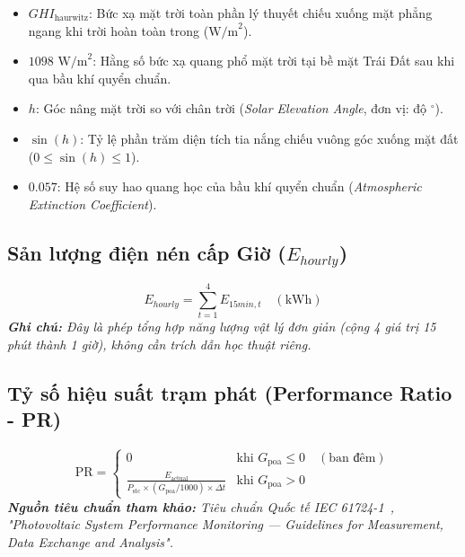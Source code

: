 \documentclass[12pt,a4paper]{article}
\begin{document}
\begin{itemize}
    \item $GHI_{\text{haurwitz}}$: Bức xạ mặt trời toàn phần lý thuyết chiếu xuống mặt phẳng ngang khi trời hoàn toàn trong ($\text{W/m}^2$).
    \item $1098 \text{ W/m}^2$: Hằng số bức xạ quang phổ mặt trời tại bề mặt Trái Đất sau khi qua bầu khí quyển chuẩn.
    \item $h$: Góc nâng mặt trời so với chân trời (\textit{Solar Elevation Angle}, đơn vị: độ $^\circ$).
    \item $\sin(h)$: Tỷ lệ phần trăm diện tích tia nắng chiếu vuông góc xuống mặt đất ($0 \le \sin(h) \le 1$).
    \item $0.057$: Hệ số suy hao quang học của bầu khí quyển chuẩn (\textit{Atmospheric Extinction Coefficient}).
\end{itemize}

\subsection{Sản lượng điện nén cấp Giờ ($E_{hourly}$)}
\begin{equation}
    E_{hourly} = \sum_{t=1}^{4} E_{15min, t} \quad (\text{kWh})
\end{equation}
\textit{\textbf{Ghi chú:} Đây là phép tổng hợp năng lượng vật lý đơn giản (cộng 4 giá trị 15 phút thành 1 giờ), không cần trích dẫn học thuật riêng.}

\subsection{Tỷ số hiệu suất trạm phát (Performance Ratio - PR)}
\begin{equation}
    \text{PR} = \begin{cases} 
      0 & \text{khi } G_{\text{poa}} \le 0 \quad (\text{ban đêm}) \\
      \frac{E_{\text{actual}}}{P_{\text{stc}} \times (G_{\text{poa}} / 1000) \times \Delta t} & \text{khi } G_{\text{poa}} > 0
    \end{cases}
\end{equation}
\textit{\textbf{Nguồn tiêu chuẩn tham khảo:} Tiêu chuẩn Quốc tế IEC 61724-1~\cite{iec61724}, "Photovoltaic System Performance Monitoring — Guidelines for Measurement, Data Exchange and Analysis".}
\end{document}
